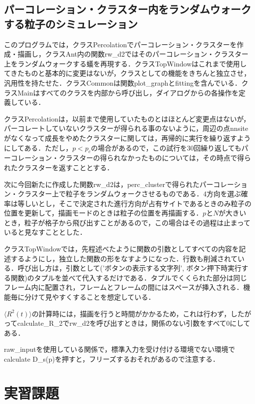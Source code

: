 \documentclass{jsarticle}
\begin{document}
    \subsection{パーコレーション・クラスター内をランダムウォークする粒子のシミュレーション}
        このプログラムでは，クラスPercolationでパーコレーション・クラスターを作成・描画し，クラスAnt内の関数rw\_d2ではそのパーコレーション・クラスター上をランダムウォークする蟻を再現する．クラスTopWindowはこれまで使用してきたものと基本的に変更はないが，クラスとしての機能をきちんと独立させ，汎用性を持たせた．クラスCommonは関数plot\_graphとfittingを含んでいる．クラスMainはすべてのクラスを内部から呼び出し，ダイアログからの各操作を定義している．
        
        クラスPercolationは，以前まで使用していたものとはほとんど変更点はないが，パーコレートしていないクラスターが得られる事のないように，周辺の点nnsiteがなくなって成長をやめたクラスターに関しては，再帰的に実行を繰り返すようにしてある．ただし，$p<p_{c}$の場合があるので，この試行を30回繰り返してもパーコレーション・クラスターの得られなかったものについては，その時点で得られたクラスターを返すこととする．
        
        次に今回新たに作成した関数rw\_d2は，perc\_clusterで得られたパーコレーション・クラスター上で粒子をランダムウォークさせるものである．4方向を選ぶ確率は等しいとし，そこで決定された進行方向が占有サイトであるときのみ粒子の位置を更新して，描画モードのときは粒子の位置を再描画する．$p$と$N$が大きいとき，粒子が格子から飛び出すことがあるので，この場合はその過程は止まっていると見なすこととした．
        
        クラスTopWindowでは，先程述べたように関数の引数としてすべての内容を記述するようにし，独立した関数の形をなすようになった．行数も削減されている．呼び出し方は，引数として('ボタンの表示する文字列', ボタン押下時実行する関数)のタプルを並べて代入するだけである．タプルでくくられた部分は同じフレーム内に配置され，フレームとフレームの間にはスペースが挿入される．機能毎に分けて見やすくすることを想定している．
        
        $\langle R^{2}(t) \rangle$の計算時には，描画を行うと時間がかかるため，これは行わず，したがってcalculate\_R\_2でrw\_d2を呼び出すときは，関係のない引数をすべて0にしてある．
        
        raw\_inputを使用している関係で，標準入力を受け付ける環境でない環境でcalculate D\_s(p)を押すと，フリーズするおそれがあるので注意する．
        
\section{実習課題}
\end{document}

